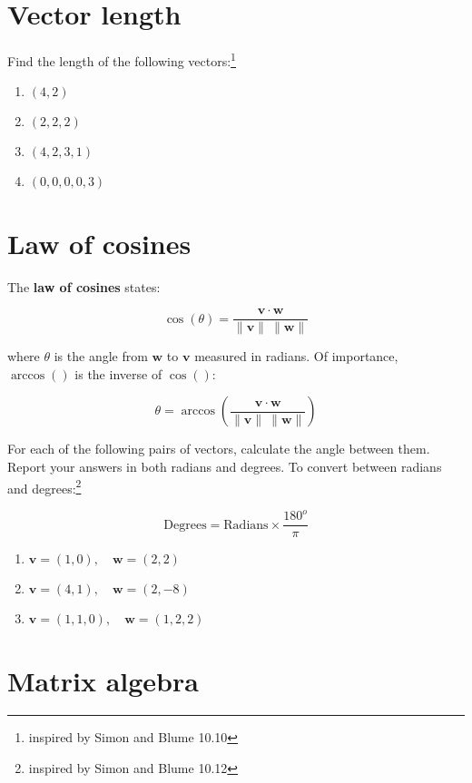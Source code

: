 \documentclass[
]{article}
\begin{document}
\section{Vector length}\label{vector-length}

Find the length of the following vectors:\footnote{inspired by Simon and
  Blume 10.10}

\begin{enumerate}
\def\labelenumi{\alph{enumi}.}
\item
  \((4, 2)\)
\item
  \((2,2,2)\)
\item
  \((4, 2, 3, 1)\)
\item
  \((0, 0, 0, 0, 3)\)
\end{enumerate}

\section{Law of cosines}\label{law-of-cosines}

The \textbf{law of cosines} states:

\[\cos(\theta) = \frac{\mathbf{v} \cdot \mathbf{w}}{\|\mathbf{v}\| \: \|\mathbf{w}\|}\]

where \(\theta\) is the angle from \(\mathbf{w}\) to \(\mathbf{v}\)
measured in radians. Of importance, \(\arccos()\) is the inverse of
\(\cos()\):

\[\theta = \arccos \left( \frac{\mathbf{v} \cdot \mathbf{w}}{\|\mathbf{v}\| \: \|\mathbf{w}\|} \right)\]

For each of the following pairs of vectors, calculate the angle between
them. Report your answers in both radians and degrees. To convert
between radians and degrees:\footnote{inspired by Simon and Blume 10.12}

\[\text{Degrees} = \text{Radians} \times \dfrac{180^{o}}{\pi}\]

\begin{enumerate}
\def\labelenumi{\alph{enumi}.}
\item
  \(\mathbf{v} = (1, 0), \quad \mathbf{w} = (2, 2)\)
\item
  \(\mathbf{v} = (4, 1), \quad \mathbf{w} = (2, -8)\)
\item
  \(\mathbf{v} = (1, 1, 0), \quad \mathbf{w} = (1, 2, 2)\)
\end{enumerate}

\section{Matrix algebra}\label{matrix-algebra}
\end{document}
